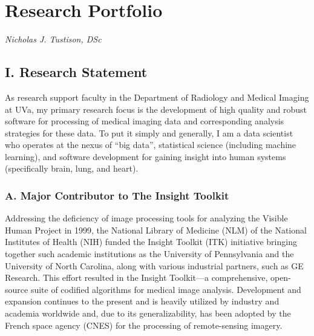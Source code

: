 \documentclass[11pt,]{article}
\title{}
\author{}
\date{}
\begin{document}
\maketitle


\section{Research Portfolio}\label{research-portfolio}

\emph{Nicholas J. Tustison, DSc}

\subsection{I. Research Statement}\label{i.-research-statement}

As research support faculty in the Department of Radiology and Medical
Imaging at UVa, my primary research focus is the development of high
quality and robust software for processing of medical imaging data and
corresponding analysis strategies for these data. To put it simply and
generally, I am a data scientist who operates at the nexus of ``big
data'', statistical science (including machine learning), and software
development for gaining insight into human systems (specifically brain,
lung, and heart).

\subsubsection{A. Major Contributor to The Insight
Toolkit}\label{a.-major-contributor-to-the-insight-toolkit}

Addressing the deficiency of image processing tools for analyzing the
Visible Human Project in 1999, the National Library of Medicine (NLM) of
the National Institutes of Health (NIH) funded the Insight Toolkit (ITK)
initiative bringing together such academic institutions as the
University of Pennsylvania and the University of North Carolina, along
with various industrial partners, such as GE Research. This effort
resulted in the Insight Toolkit---a comprehensive, open-source suite of
codified algorithms for medical image analysis. Development and
expansion continues to the present and is heavily utilized by industry
and academia worldwide and, due to its generalizability, has been
adopted by the French space agency (CNES) for the processing of
remote-sensing imagery.
\end{document}
